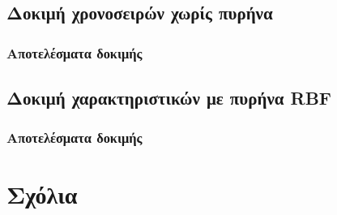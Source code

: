 \subsection{Δοκιμή χρονοσειρών χωρίς πυρήνα}
\subsubsection{Αποτελέσματα δοκιμής}
\subsection{Δοκιμή χαρακτηριστικών με πυρήνα RBF}
\subsubsection{Αποτελέσματα δοκιμής}
\section{Σχόλια}